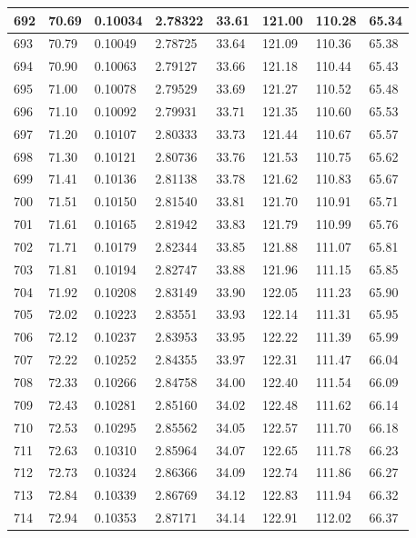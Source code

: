 \documentclass[12pt,a4paper,twoside]{article}
\begin{document}
\begin{center}
\begin{longtable}{l l l l | l l l l}
692 & 70.69 & 0.10034 & 2.78322 & 33.61 & 121.00 & 110.28 & 65.34 \\ \hline
693 & 70.79 & 0.10049 & 2.78725 & 33.64 & 121.09 & 110.36 & 65.38 \\ \hline
694 & 70.90 & 0.10063 & 2.79127 & 33.66 & 121.18 & 110.44 & 65.43 \\ \hline
695 & 71.00 & 0.10078 & 2.79529 & 33.69 & 121.27 & 110.52 & 65.48 \\ \hline
696 & 71.10 & 0.10092 & 2.79931 & 33.71 & 121.35 & 110.60 & 65.53 \\ \hline
697 & 71.20 & 0.10107 & 2.80333 & 33.73 & 121.44 & 110.67 & 65.57 \\ \hline
698 & 71.30 & 0.10121 & 2.80736 & 33.76 & 121.53 & 110.75 & 65.62 \\ \hline
699 & 71.41 & 0.10136 & 2.81138 & 33.78 & 121.62 & 110.83 & 65.67 \\ \hline
700 & 71.51 & 0.10150 & 2.81540 & 33.81 & 121.70 & 110.91 & 65.71 \\ \hline
701 & 71.61 & 0.10165 & 2.81942 & 33.83 & 121.79 & 110.99 & 65.76 \\ \hline
702 & 71.71 & 0.10179 & 2.82344 & 33.85 & 121.88 & 111.07 & 65.81 \\ \hline
703 & 71.81 & 0.10194 & 2.82747 & 33.88 & 121.96 & 111.15 & 65.85 \\ \hline
704 & 71.92 & 0.10208 & 2.83149 & 33.90 & 122.05 & 111.23 & 65.90 \\ \hline
705 & 72.02 & 0.10223 & 2.83551 & 33.93 & 122.14 & 111.31 & 65.95 \\ \hline
706 & 72.12 & 0.10237 & 2.83953 & 33.95 & 122.22 & 111.39 & 65.99 \\ \hline
707 & 72.22 & 0.10252 & 2.84355 & 33.97 & 122.31 & 111.47 & 66.04 \\ \hline
708 & 72.33 & 0.10266 & 2.84758 & 34.00 & 122.40 & 111.54 & 66.09 \\ \hline
709 & 72.43 & 0.10281 & 2.85160 & 34.02 & 122.48 & 111.62 & 66.14 \\ \hline
710 & 72.53 & 0.10295 & 2.85562 & 34.05 & 122.57 & 111.70 & 66.18 \\ \hline
711 & 72.63 & 0.10310 & 2.85964 & 34.07 & 122.65 & 111.78 & 66.23 \\ \hline
712 & 72.73 & 0.10324 & 2.86366 & 34.09 & 122.74 & 111.86 & 66.27 \\ \hline
713 & 72.84 & 0.10339 & 2.86769 & 34.12 & 122.83 & 111.94 & 66.32 \\ \hline
714 & 72.94 & 0.10353 & 2.87171 & 34.14 & 122.91 & 112.02 & 66.37 \\ \hline

\end{longtable}
\end{center}
\end{document}
